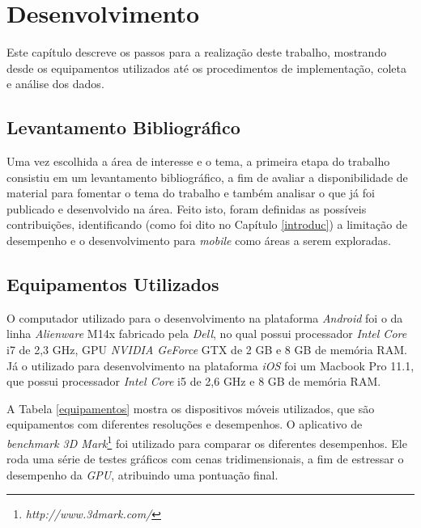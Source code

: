 \chapter[Desenvolvimento]{Desenvolvimento}

	Este capítulo descreve os passos para a realização deste trabalho, mostrando desde os equipamentos utilizados até os procedimentos de implementação, coleta e análise dos dados. 

\section{Levantamento Bibliográfico}

Uma vez escolhida a área de interesse e o tema, a primeira etapa do trabalho consistiu em um levantamento bibliográfico, a fim de avaliar a disponibilidade de material para fomentar o tema do trabalho e também analisar o que já foi publicado e desenvolvido na área. Feito isto, foram definidas as possíveis contribuições, identificando (como foi dito no Capítulo \ref{introduc}) a limitação de desempenho e o desenvolvimento para \textit{mobile} como áreas a serem exploradas.  

\section{Equipamentos Utilizados}
\label{equip}

	 O computador utilizado para o desenvolvimento na plataforma \textit{Android} foi o da linha \textit{Alienware} M14x fabricado pela \textit{Dell}, no qual possui processador \textit{Intel Core} i7 de 2,3 GHz, GPU \textit{NVIDIA GeForce} GTX de 2 GB e 8 GB de memória RAM.  Já o utilizado para desenvolvimento na plataforma \textit{iOS} foi um Macbook Pro 11.1, que possui processador \textit{Intel Core} i5 de 2,6 GHz e 8 GB de memória RAM.

	A Tabela \ref{equipamentos} mostra os dispositivos móveis utilizados, que são equipamentos com diferentes resoluções e desempenhos. O aplicativo de \textit{benchmark 3D Mark}\footnote{\textit{http://www.3dmark.com/}} foi utilizado para comparar os diferentes desempenhos. Ele roda uma série de testes gráficos com cenas tridimensionais, a fim de estressar o desempenho da \textit{GPU}, atribuindo uma pontuação final.
	
